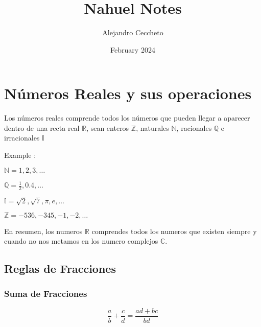 \documentclass{article}
\title{Nahuel Notes}
\author{Alejandro Ceccheto}
\date{February 2024}
\begin{document}
	
	\maketitle
	
	
	\pagebreak
	\tableofcontents
	\pagebreak
	
	
	\section{Números Reales y sus operaciones}
	\begin{theo}
		Los números reales comprende todos los números que pueden llegar a aparecer dentro de una recta real $\mathbb{R}$, sean enteros $\mathbb{Z}$, naturales $\mathbb{N}$, racionales $\mathbb{Q}$ e irracionales $\mathbb{I}$
	\end{theo}
	
	\vspace{1cm}
	
	Example : 
	
	$\mathbb{N} = 1, 2, 3, \dots$ 
	
	$\mathbb{Q} = \frac{1}{2}, 0.4, \dots$ 
	
	$\mathbb{I} = \sqrt{2}, \sqrt{7}, \pi, e, \dots$ 
	
	$\mathbb{Z} = -536, -345, -1, -2, \dots$ 
	
	En resumen, los numeros $\mathbb{R}$ comprendes todos los numeros que existen siempre y cuando no nos metamos en los numero complejos $\mathbb{C}$.
	
	
	\subsection{Reglas de Fracciones}
	
	\subsubsection{Suma de Fracciones}
	\begin{equation*}
		\frac{a}{b} + \frac{c}{d} = \frac{ad+bc}{bd}
	\end{equation*}
\end{document}
